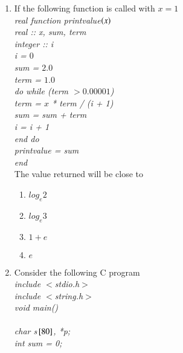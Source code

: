 \documentclass[journal]{IEEEtran}
\begin{document}
\begin{enumerate}
{{        r = g\\
    else\\
        r = g\\
    end if\\
end\\}
Which value will be returned if the function $g$ is called with $6,6$?
\begin{enumerate}
\item 2 
\item 4
\item 6
\item 8
\end{enumerate}
}
\item{
If the following function is called with $x=1$\\
\textit{
real function print\textunderscore value$\left(x\right)$\\
    real :: x, sum, term\\
    integer :: i\\
    i = $0$\\
    sum = $2.0$\\
    term = $1.0$\\
    do while (term $> 0.00001$)\\
        term = $x$ * term / (i + 1)\\
        sum = sum + term\\
        i = i + 1\\
    end do\\
    print\textunderscore value = sum\\
end\\
}
The value returned will be close to
\begin{multicols}{4}
\begin{enumerate}
\item $log_e2$
\item $log_e3$
\item $1+e$
\item $e$
\end{enumerate}
\end{multicols}
}
\item{
Consider the following C program\\
\textit{
include $<$stdio.h$>$\\
include $<$string.h$>$\\
void main()\\
{\\
    char s${}\left[80\right]$, *p;\\
    int sum = 0;\\
}}}
\end{enumerate}
\end{document}

